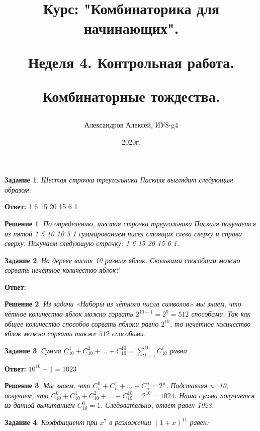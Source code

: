 \documentclass[a4paper,oneside]{memoir}
\title{Курс: "Комбинаторика для начинающих".
	
Неделя 4. Контрольная работа.
	 
Комбинаторные тождества.}
\author{Александров Алексей, ИУ8-g4}
\date{2020г.}
\newtheorem{task}{Задание}
\newtheorem{solution}{Решение}
\begin{document}
	
\maketitle

\begin{task}
	Шестая строчка треугольника Паскаля выглядит следующим образом:
\end{task}

\textbf{Ответ:}  1 6 15 20 15 6 1 

\begin{solution}
По определению, шестая строчка треугольника Паскаля получается из пятой 1 5 10 10 5 1 суммированием чисел стоящих слева сверху и справа сверху. Получаем следующую строчку: 1 6 15 20 15 6 1.
\end{solution}

\hrulefill

\begin{task}
	На дереве висит 10 разных яблок. Сколькими способами можно сорвать нечётное количество яблок?
\end{task}

\textbf{Ответ:} $  $

\begin{solution}
	Из задачи «Наборы из чётного числа символов» мы знаем, что чётное количество яблок можно сорвать $ 2^{10-1} = 2^9 = 512 $ способами. Так как общее количество способов сорвать яблоки равно $ 2^{10} $, то нечётное количество яблок можно сорвать также $ 512 $ способами.
\end{solution}

\hrulefill

\begin{task}
	Сумма $ C_{10}^1+C_{10}^2+\ldots+C_{10}^{10} = \sum\limits_{i=1}^{10}C_{10}^i $ равна
\end{task}

\textbf{Ответ:} $ 10^{10} - 1 = 1023 $

\begin{solution}
	Мы знаем, что $ C_{n}^0 + C_n^1+ \ldots +C_n^n = 2^n $. Подставляя n=10, получаем, что $ C_{10}^0 + C_{10}^1+C_{10}^2+\ldots+C_{10}^{10} = 2^{10}=1024 $. Наша сумма получается из данной вычитанием $ C_{10}^0 = 1 $. Следовательно, ответ равен 1023.
\end{solution}

\hrulefill

\begin{task}
	 Коэффициент при $ x^7 $ в разложении $ (1+x)^{11} $ равен:
\end{task}
\end{document}
